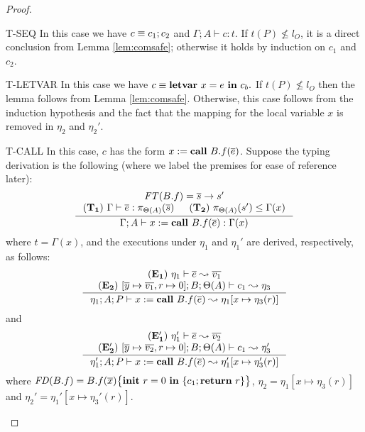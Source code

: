 {{{\begin{proof}
\begin{ProofEnumDesc}
\item[T-SEQ] In this case we have
  $c\equiv{c_1};{c_2}$ and $\Gamma;A\vdash c:t$. If $t(P)\not\leq l_{O}$, it is a direct conclusion from Lemma \ref{lem:comsafe}; otherwise it holds by induction on $c_1$ and $c_2$.

\item[T-LETVAR]
  In this case we have $c\equiv{\textbf{letvar}~ {x} = {e} ~\textbf{in}~ {c_b}}.$
  If $t(P) \nleq l_O$ then the lemma follows from Lemma \ref{lem:comsafe}.
  Otherwise, this case follows from the induction hypothesis and the fact
  that the mapping for the local variable $x$ is removed
  in $\eta_2$ and $\eta_2'.$
\item[T-CALL]
In this case, $c$ has the form
${x}:=\textbf{call}~{B.f}({\overline{e}})$. Suppose the typing
derivation is the following (where we label the premises
for ease of reference later):
$$
\inference
{
\FT(B.f) = \overline{s} \rightarrow s' \\
(\mathbf{T_1}) ~ \Gamma \vdash \overline{e} : \app{\overline{s}}{\Theta(A)} &
(\mathbf{T_2}) ~ \app{s'}{\Theta(A)} \leq \Gamma(x)}
{\Gamma; A \vdash \lcCALL{x}{B.f}{\overline{e}} :
 \Gamma(x)  }
$$
where $t = \Gamma(x)$,
and the executions under $\eta_1$ and $\eta_1'$ are
derived, respectively, as follows:
$$
\inference{
(\mathbf{E_1}) ~ \eta_1\vdash\overline{e} \leadsto \overline{v_1} \\
(\mathbf{E_2}) ~ [\overline{y} \mapsto \overline{v_1}, r \mapsto 0] ; B;
  \Theta(A) \vdash c_1 \leadsto \eta_3
}
{\eta_1; A; P \vdash \lcCALL{x}{B.f}{\overline{e}} \leadsto
              \eta_1 [x \mapsto \eta_3(r) ]}
$$
and
$$
\inference{
(\mathbf{E_1'}) ~ \eta_1'\vdash\overline{e} \leadsto \overline{v_2}
\\
(\mathbf{E_2'}) ~ [\overline{y} \mapsto \overline{v_2}, r \mapsto 0] ; B;
\Theta(A) \vdash c_1 \leadsto \eta_3'}
{\eta_1';A;P \vdash \lcCALL{x}{B.f}{\overline{e}} \leadsto
              \eta_1' [x \mapsto \eta_3'(r) ]}
$$
where
$\mathit{FD}(B.f) = {B.f}(\overline{x})\big\{{{\textbf{init}~ {r}=0 ~\textbf{in}~\{{c_1};\textbf{return}~{r}\}}}\big\}$,
$\eta_2 = \eta_1[x \mapsto \eta_3(r)]$
and $\eta_2' = \eta_1'[x \mapsto \eta_3'(r)].$


\end{ProofEnumDesc}
\end{proof}}}}

